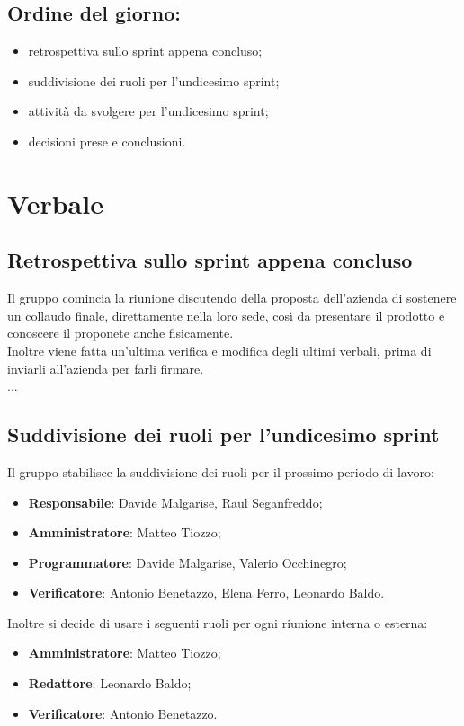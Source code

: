 \documentclass[italian,12pt]{article}
\begin{document}
\subsection*{Ordine del giorno:}
\begin{itemize}
	\item retrospettiva sullo sprint appena concluso;
	\item suddivisione dei ruoli per l'undicesimo sprint;
	\item attività da svolgere per l'undicesimo sprint;
	\item decisioni prese e conclusioni.
\end{itemize}


\newpage

\section{Verbale}

\subsection{Retrospettiva sullo sprint appena concluso}
Il gruppo comincia la riunione discutendo della proposta dell'azienda di sostenere un collaudo finale, direttamente nella loro sede, così da presentare il prodotto e conoscere il proponete anche fisicamente. \\
Inoltre viene fatta un'ultima verifica e modifica degli ultimi verbali, prima di inviarli all'azienda per farli firmare. \\
...

\subsection{Suddivisione dei ruoli per l'undicesimo sprint}
Il gruppo stabilisce la suddivisione dei ruoli per il prossimo periodo di lavoro:
\begin{itemize}
	\item \textbf{Responsabile}: Davide Malgarise, Raul Seganfreddo;
	\item \textbf{Amministratore}: Matteo Tiozzo;
	\item \textbf{Programmatore}: Davide Malgarise, Valerio Occhinegro;
	\item \textbf{Verificatore}: Antonio Benetazzo, Elena Ferro, Leonardo Baldo.
\end{itemize}
Inoltre si decide di usare i seguenti ruoli per ogni riunione interna o esterna:
\begin{itemize}
	\item \textbf{Amministratore}: Matteo Tiozzo;
	\item \textbf{Redattore}: Leonardo Baldo;
	\item \textbf{Verificatore}: Antonio Benetazzo.
\end{itemize}
\end{document}

